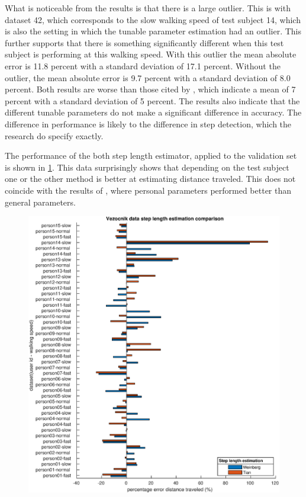 What is noticeable from the results is that there is a large outlier. This is with dataset 42, which corresponds to the slow walking speed of test subject 14, which is also the setting in which the tunable parameter estimation had an outlier. This further supports that there is something significantly different when this test subject is performing at this walking speed. With this outlier the mean absolute error is 11.8 percent with a standard deviation of 17.1 percent. Without the outlier, the mean absolute error is 9.7 percent with a standard deviation of 8.0 percent. Both results are worse than those cited by \cite{Vezocnik2019}, which indicate a mean of 7 percent with a standard deviation of 5 percent.
The results also indicate that the different tunable parameters do not make a significant difference in accuracy. The difference in performance is likely to the difference in step detection, which the research do specify exactly. \par

The performance of the both step length estimator, applied to the validation set is shown in  \cref{fig:202011131943_wienberg_vs_tian_vezocnik_data1}. This data surprisingly shows that depending on the test subject one or the other method is better at estimating distance traveled. This does not coincide with the results of \cite{Vezocnik2019}, where personal parameters performed better than general parameters.

\begin{figure}[H]
	\centering
	\includegraphics[width=\linewidth]{images/20201113_1943_wienberg_vs_tian_vezocnik_data_1}
	\caption{}
	\label{fig:202011131943_wienberg_vs_tian_vezocnik_data1}
\end{figure}
 
